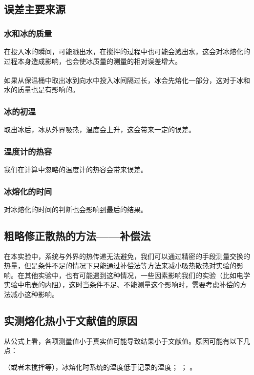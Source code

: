 \documentclass[a4paper,11pt]{article}
\begin{document}
\begin{CJK*}{UTF8}{gbsn}
\subsection{误差主要来源}
\subsubsection{水和冰的质量}
在投入冰的瞬间，可能溅出水，在搅拌的过程中也可能会溅出水，这会对冰熔化的过程本身造成影响，也会使冰质量的测量的相对误差增大。\\ \\
如果从保温桶中取出冰到向水中投入冰间隔过长，冰会先熔化一部分，这对于冰和水的质量也是有影响的。

\subsubsection{冰的初温}
取出冰后，冰从外界吸热，温度会上升，这会带来一定的误差。

\subsubsection{温度计的热容}
我们在计算中忽略的温度计的热容会带来误差。

\subsubsection{冰熔化的时间}
对冰熔化的时间的判断也会影响到最后的结果。

\subsection{粗略修正散热的方法——补偿法}
在本实验中，系统与外界的热传递无法避免，我们可以通过精密的手段测量交换的热量，但是条件不足的情况下只能通过补偿法等方法来减小吸热散热对实验的影响。在其他实验中，也有可能遇到这种情况，一些因素影响我们的实验（比如电学实验中电表的内阻），这时当条件不足、不能测量这个影响时，需要考虑补偿的方法减小这种影响。

\subsection{实测熔化热小于文献值的原因}
从公式上看，各项测量值小于真实值可能导致结果小于文献值。原因可能有以下几点：
\begin{itemize}
（或者未搅拌等），冰熔化时系统的温度低于记录的温度；
；
。
\end{itemize}



\end{CJK*}
\end{document}
